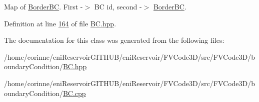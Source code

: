 Map of \hyperlink{classFVCode3D_1_1BoundaryConditions_1_1BorderBC}{Border\+BC}. First -\/$>$ BC id, second -\/$>$ \hyperlink{classFVCode3D_1_1BoundaryConditions_1_1BorderBC}{Border\+BC}. 



Definition at line \hyperlink{BC_8hpp_source_l00164}{164} of file \hyperlink{BC_8hpp_source}{B\+C.\+hpp}.



The documentation for this class was generated from the following files\+:\begin{DoxyCompactItemize}
\item 
/home/corinne/eni\+Reservoir\+G\+I\+T\+H\+U\+B/eni\+Reservoir/\+F\+V\+Code3\+D/src/\+F\+V\+Code3\+D/boundary\+Condition/\hyperlink{BC_8hpp}{B\+C.\+hpp}\item 
/home/corinne/eni\+Reservoir\+G\+I\+T\+H\+U\+B/eni\+Reservoir/\+F\+V\+Code3\+D/src/\+F\+V\+Code3\+D/boundary\+Condition/\hyperlink{BC_8cpp}{B\+C.\+cpp}\end{DoxyCompactItemize}
